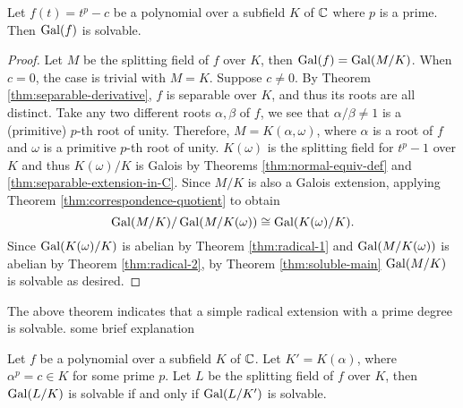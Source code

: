 \begin{theorem} \label{thm:radical-simple-solvable}
	Let $f(t) = t^p - c$ be a polynomial over a subfield $K$ of $\mathbb C$ where $p$ is a prime. Then $\operatorname{Gal}(f)$ is solvable. 
\end{theorem}
\begin{proof}
	Let $M$ be the splitting field of $f$ over $K$, then $\operatorname{Gal}(f) = \operatorname{Gal}(M / K)$. 
	When $c = 0$, the case is trivial with $M = K$. Suppose $c \neq 0$. By Theorem \ref{thm:separable-derivative}, $f$ is separable over $K$, and thus its roots are all distinct. Take any two different roots $\alpha, \beta$ of $f$, we see that $\alpha / \beta \neq 1$ is a (primitive) $p$-th root of unity. Therefore, $M = K(\alpha, \omega)$, where $\alpha$ is a root of $f$ and $\omega$ is a primitive $p$-th root of unity. $K(\omega)$ is the splitting field for $t^p - 1$ over $K$ and thus $K(\omega) / K$ is Galois by Theorems \ref{thm:normal-equiv-def} and \ref{thm:separable-extension-in-C}.  Since $M / K$ is also a Galois extension, applying Theorem \ref{thm:correspondence-quotient} to obtain $$\operatorname{Gal}(M / K) / \operatorname{Gal}(M / K(\omega)) \cong \operatorname{Gal}(K(\omega) / K). $$
	Since $\operatorname{Gal}(K(\omega)/K)$ is abelian by Theorem \ref{thm:radical-1} and $\operatorname{Gal}(M / K(\omega))$ is abelian by Theorem \ref{thm:radical-2}, by Theorem \ref{thm:soluble-main} $\operatorname{Gal}(M/K)$ is solvable as desired. 
\end{proof}

The above theorem indicates that a simple radical extension with a prime degree is solvable. \TODO some brief explanation



\begin{theorem} \label{thm:solvable:chain}
	Let $f$ be a polynomial over a subfield $K$ of $\mathbb C$. Let $K' = K(\alpha)$, where $\alpha^p = c \in K$ for some prime $p$. Let $L$ be the splitting field of $f$ over $K$, then $\operatorname{Gal}(L/K)$ is solvable if and only if $\operatorname{Gal}(L / K')$ is solvable. 
\end{theorem}

